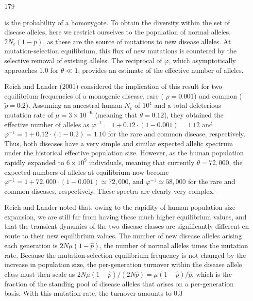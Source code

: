 \documentclass{article}
\begin{document}
179

is the probability of a homozygote. To obtain the diversity within the set of disease alleles, here we restrict ourselves to the population of normal alleles,  $ 2N_e(1 - \bar{p}) $, as these are the source of mutations to new disease alleles. At mutation-selection equilibrium, this flux of new mutations is countered by the selective removal of existing alleles. The reciprocal of  $ \varphi $, which asymptotically approaches 1.0 for  $ \theta \ll 1 $, provides an estimate of the effective number of alleles.

Reich and Lander (2001) considered the implication of this result for two equilibrium frequencies of a monogenic disease, rare ( $ \tilde{\rho} = 0.001 $) and common ( $ \tilde{\rho} = 0.2 $). Assuming an ancestral human  $ N_e $ of  $ 10^4 $ and a total deleterious mutation rate of  $ \mu = 3 \times 10^{-6} $ (meaning that  $ \theta = 0.12 $), they obtained the effective number of alleles as  $ \varphi^{-1} = 1 + 0.12 \cdot (1 - 0.001) = 1.12 $ and  $ \varphi^{-1} = 1 + 0.12 \cdot (1 - 0.2) = 1.10 $ for the rare and common disease, respectively. Thus, both diseases have a very simple and similar expected allelic spectrum under the historical effective population size. However, as the human population rapidly expanded to  $ 6 \times 10^9 $ individuals, meaning that currently  $ \theta = 72,000 $, the expected numbers of alleles at equilibrium now become  $ \varphi^{-1} = 1 + 72,000 \cdot (1 - 0.001) \simeq 72,000 $, and  $ \varphi^{-1} \simeq 58,000 $ for the rare and common diseases, respectively. These spectra are clearly very complex.

Reich and Lander noted that, owing to the rapidity of human population-size expansion, we are still far from having these much higher equilibrium values, and that the transient dynamics of the two disease classes are significantly different en route to their new equilibrium values. The number of new disease alleles arising each generation is  $ 2N\mu(1-\hat{p}) $, the number of normal alleles times the mutation rate. Because the mutation-selection equilibrium frequency is not changed by the increase in population size, the per-generation turnover within the disease allele class must then scale as  $ 2N\mu(1-\hat{p})/(2N\hat{p})=\mu(1-\hat{p})/\hat{p} $, which is the fraction of the standing pool of disease alleles that arises on a per-generation basis. With this mutation rate, the turnover amounts to 0.3%
\end{document}

